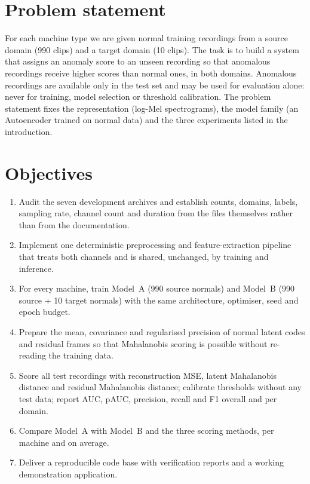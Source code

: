 \section{Problem statement}
For each machine type we are given normal training recordings from a source domain (990 clips) and a target domain (10 clips). The task is to build a system that assigns an anomaly score to an unseen recording so that anomalous recordings receive higher scores than normal ones, in both domains. Anomalous recordings are available only in the test set and may be used for evaluation alone: never for training, model selection or threshold calibration. The problem statement fixes the representation (log-Mel spectrograms), the model family (an Autoencoder trained on normal data) and the three experiments listed in the introduction.

\section{Objectives}
\begin{enumerate}
  \item Audit the seven development archives and establish counts, domains, labels, sampling rate, channel count and duration from the files themselves rather than from the documentation.
  \item Implement one deterministic preprocessing and feature-extraction pipeline that treats both channels and is shared, unchanged, by training and inference.
  \item For every machine, train Model~A (990 source normals) and Model~B (990 source + 10 target normals) with the same architecture, optimiser, seed and epoch budget.
  \item Prepare the mean, covariance and regularised precision of normal latent codes and residual frames so that Mahalanobis scoring is possible without re-reading the training data.
  \item Score all test recordings with reconstruction MSE, latent Mahalanobis distance and residual Mahalanobis distance; calibrate thresholds without any test data; report AUC, pAUC, precision, recall and F1 overall and per domain.
  \item Compare Model~A with Model~B and the three scoring methods, per machine and on average.
  \item Deliver a reproducible code base with verification reports and a working demonstration application.
\end{enumerate}

